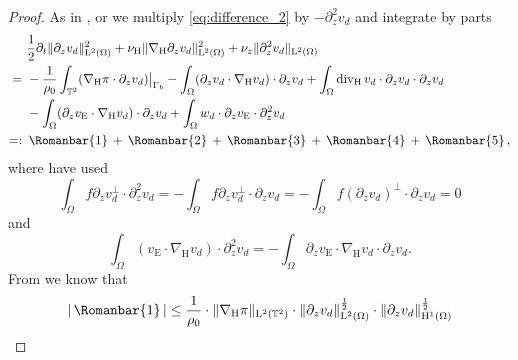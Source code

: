 \documentclass[preprint]{elsarticle}
\numberwithin{equation}{section}
\newcommand {\T}	{\mathbb{T}}
\DeclareMathOperator{\divH}{div_{\H}}
\renewcommand{\H}{\mathrm{H}}
\newcommand{\nablaH}{\nabla_{\H}}
\newcommand{\rL}{\mathrm{L}}
\newcommand{\rH}{\H}
\newcommand{\rE}{\mathrm{E}}
\newcommand{\I}{\, \Romanbar{1} \, }
\newcommand{\II}{\, \Romanbar{2}\, }
\newcommand{\III}{\, \Romanbar{3}\, }
\newcommand{\IV}{\, \Romanbar{4}\, }
\newcommand{\V}{\, \Romanbar{5}\, }
\begin{document}
\begin{proof}
	As in \cite[p. 2743]{KZ:07_2}, \cite[Step 2]{HK:16_2} or \cite[Step 3]{GGHHK:20_2} we 
	multiply \eqref{eq:difference_2} by $-\partial_z^2 v_d$ and integrate by parts
	\begin{equation*}
		\begin{aligned}
			&\frac{1}{2} \partial_t \| \partial_z v_d \|_{\rL^2(\Omega)}^2 
			+ \nu_{\rH} \| \nablaH \partial_z v_d \|_{\rL^2(\Omega)}^2
			+ \nu_z \| \partial_z^2 v_d \|_{\rL^2(\Omega)}
			\\
			= \ & 
			- \frac{1}{\rho_0} \int_{\T^2} (\nablaH \pi \cdot \partial_z v_d)\big|_{\Gamma_b} 
			- \int_\Omega (\partial_z v_d \cdot \nablaH v_d) \cdot \partial_z v_d 
			+ \int_\Omega \divH v_d \cdot \partial_z v_d \cdot \partial_z v_d \\
			\ &- \int_\Omega (\partial_z v_{\rE} \cdot \nablaH v_d) \cdot \partial_z v_d 
			+ \int_\Omega w_d \cdot \partial_z v_{\rE} \cdot \partial_z^2 v_d \\
			=: \ & \I + \II + \III + \IV + \V, 
		\end{aligned}
	\end{equation*}
	where have used 
	\begin{equation*}
		\int_\Omega f \partial_z v_d^\perp \cdot \partial_z^2 v_d
		= - \int_\Omega f \partial_z v_d^\perp \cdot \partial_z v_d
		= - \int_\Omega f (\partial_z v_d)^\perp \cdot  \partial_z v_d
		= 0 
	\end{equation*}
	and
	\begin{equation*}
		\int_\Omega (v_{\rE} \cdot \nablaH v_d) \cdot \partial_z^2 v_d 
		= 
		- \int_\Omega \partial_z v_{\rE} \cdot \nablaH v_d \cdot \partial_z v_d .
	\end{equation*}
	From \cite[Step 2, (6.7)]{HK:16_2} we know that
	\begin{align*}
		| \I |
		&\leq \frac{1}{\rho_0} \cdot\| \nablaH \pi \|_{\rL^2(\T^2)}
		\cdot \| \partial_z v_d\|_{\rL^{2}(\Omega)}^{\frac{1}{2}}
		\cdot \| \partial_z v_d\|_{\rH^{1}(\Omega)}^{\frac{1}{2}} \\

\end{align*}
\end{proof}
\end{document}
